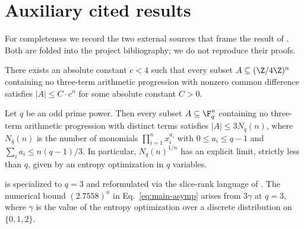 \section{Auxiliary cited results}
\label{sec:auxiliary}

For completeness we record the two external sources that frame the result of . Both are folded into the project bibliography; we do not reproduce their proofs.

\begin{theorem}\label{thm:CLP-external}
There exists an absolute constant $c < 4$ such that every subset $A \subseteq (\Z/4\Z)^n$ containing no three-term arithmetic progression with nonzero common difference satisfies $|A| \le C \cdot c^n$ for some absolute constant $C > 0$.
\end{theorem}

\begin{theorem}\label{thm:EG-external}
Let $q$ be an odd prime power. Then every subset $A \subseteq \F_q^n$ containing no three-term arithmetic progression with distinct terms satisfies $|A| \le 3 N_q(n)$, where $N_q(n)$ is the number of monomials $\prod_{i=1}^n x_i^{a_i}$ with $0 \le a_i \le q-1$ and $\sum_i a_i \le n(q-1)/3$. In particular, $N_q(n)^{1/n}$ has an explicit limit, strictly less than $q$, given by an entropy optimization in $q$ variables.
\end{theorem}

\begin{remark}\label{rem:external-vs-main}
 is  specialized to $q = 3$ and reformulated via the slice-rank language of \cite{Tao2016blog}. The numerical bound $(2.7558)^n$ in Eq.~\eqref{eq:main-asymp} arises from $3\gamma$ at $q = 3$, where $\gamma$ is the value of the entropy optimization over a discrete distribution on $\{0, 1, 2\}$.
\end{remark}
